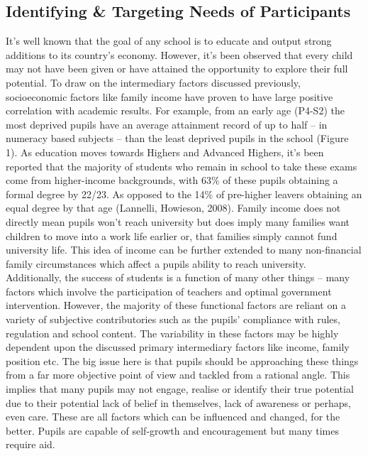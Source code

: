 \documentclass[11pt, english]{article}
\begin{document}
	\subsection{Identifying \& Targeting Needs of Participants}

	It’s well known that the goal of any school is to educate and output strong additions to its country’s economy. However, it’s been observed that every child may not have been given or have attained the opportunity to explore their full potential. To draw on the intermediary factors discussed previously, socioeconomic factors like family income have proven to have large positive correlation with academic results. For example, from an early age (P4-S2) the most deprived pupils have an average attainment record of up to half – in numeracy based subjects – than the least deprived pupils in the school (Figure 1). As education moves towards Highers and Advanced Highers, it’s been reported that the majority of students who remain in school to take these exams come from higher-income backgrounds, with 63\% of these pupils obtaining a formal degree by 22/23. As opposed to the 14\% of pre-higher leavers obtaining an equal degree by that age (Lannelli, Howieson, 2008). Family income does not directly mean pupils won’t reach university but does imply many families want children to move into a work life earlier or, that families simply cannot fund university life. This idea of income can be further extended to many non-financial family circumstances which affect a pupils ability to reach university.\\

	Additionally, the success of students is a function of many other things – many factors which involve the participation of teachers and optimal government intervention. However, the majority of these functional factors are reliant on a variety of subjective contributories such as the pupils’ compliance with rules, regulation and school content. The variability in these factors may be highly dependent upon the discussed primary intermediary factors like income, family position etc. The big issue here is that pupils should be approaching these things from a far more objective point of view and tackled from a rational angle. This implies that many pupils may not engage, realise or identify their true potential due to their potential lack of belief in themselves, lack of awareness or perhaps, even care. These are all factors which can be influenced and changed, for the better. Pupils are capable of self-growth and encouragement but many times require aid.\\
\end{document}
